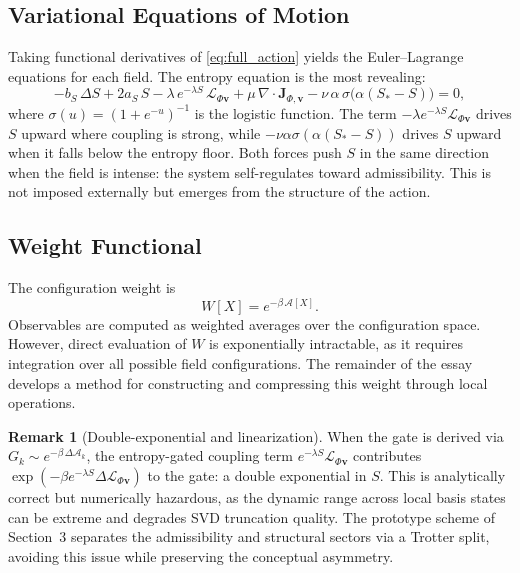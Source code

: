 \documentclass[11pt]{article}
\theoremstyle{definition}
\newtheorem{remark}[theorem]{Remark}
\begin{document}
\subsection{Variational Equations of Motion}

Taking functional derivatives of \eqref{eq:full_action} yields the
Euler--Lagrange equations for each field. The entropy equation is the most
revealing:
\begin{equation}
  -b_S\,\Delta S + 2a_S\,S
  - \lambda\,e^{-\lambda S}\,\mathcal{L}_{\Phi\mathbf{v}}
  + \mu\,\nabla\cdot\mathbf{J}_{\Phi,\mathbf{v}}
  - \nu\,\alpha\,\sigma\!\bigl(\alpha(S_*-S)\bigr)
  = 0,
  \label{eq:EL_S}
\end{equation}
where $\sigma(u) = (1+e^{-u})^{-1}$ is the logistic function. The term
$-\lambda e^{-\lambda S}\mathcal{L}_{\Phi\mathbf{v}}$ drives $S$ upward where
coupling is strong, while $-\nu\alpha\sigma(\alpha(S_*-S))$ drives $S$ upward
when it falls below the entropy floor. Both forces push $S$ in the same
direction when the field is intense: the system self-regulates toward
admissibility. This is not imposed externally but emerges from the structure of
the action.

\subsection{Weight Functional}

The configuration weight is
\begin{equation}
  W[X] = e^{-\beta\,\mathcal{A}[X]}.
\end{equation}
Observables are computed as weighted averages over the configuration space.
However, direct evaluation of $W$ is exponentially intractable, as it requires
integration over all possible field configurations. The remainder of the essay
develops a method for constructing and compressing this weight through local
operations.

\begin{remark}[Double-exponential and linearization]
  When the gate is derived via $G_k \sim e^{-\beta\,\Delta\mathcal{A}_k}$, the
  entropy-gated coupling term $e^{-\lambda S}\mathcal{L}_{\Phi\mathbf{v}}$
  contributes $\exp(-\beta e^{-\lambda S}\Delta\mathcal{L}_{\Phi\mathbf{v}})$
  to the gate: a double exponential in $S$. This is analytically correct but
  numerically hazardous, as the dynamic range across local basis states can be
  extreme and degrades SVD truncation quality. The prototype scheme of
  Section~3 separates the admissibility and structural sectors via a Trotter
  split, avoiding this issue while preserving the conceptual asymmetry.
\end{remark}
\end{document}
